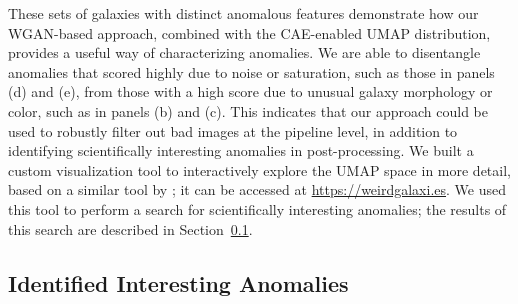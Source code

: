 These sets of galaxies with distinct anomalous features demonstrate how our WGAN-based approach, combined with the CAE-enabled UMAP distribution, provides a useful way of characterizing anomalies.
We are able to disentangle anomalies that scored highly due to noise or saturation, such as those in panels (d) and (e), from those with a high score due to unusual galaxy morphology or color, such as in panels (b) and (c).
This indicates that our approach could be used to robustly filter out bad images at the pipeline level, in addition to identifying scientifically interesting anomalies in post-processing.
We built a custom visualization tool to interactively explore the UMAP space in more detail, based on a similar tool by \cite{Reis2021}; it can be accessed at \url{https://weirdgalaxi.es}.
We used this tool to perform a search for scientifically interesting anomalies; the results of this search are described in Section~\ref{sec:interesting}.


\subsection{Identified Interesting Anomalies}
\label{sec:interesting}

